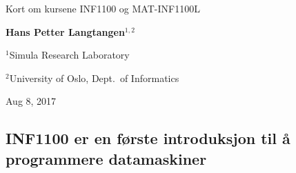 \documentclass[%
oneside,                 %
final,                   %
10pt]{article}
\begin{document}

\newcommand{\exercisesection}[1]{\subsection*{#1}}







\thispagestyle{empty}

\begin{center}
{\LARGE\bf
\begin{spacing}{1.25}
Kort om kursene INF1100 og MAT-INF1100L
\end{spacing}
}
\end{center}


\begin{center}
{\bf Hans Petter Langtangen${}^{1, 2}$} \\ [0mm]
\end{center}

\begin{center}
\centerline{{\small ${}^1$Simula Research Laboratory}}
\centerline{{\small ${}^2$University of Oslo, Dept.~of Informatics}}
\end{center}
    

\begin{center}
Aug 8, 2017
\end{center}

\vspace{1cm}


\subsection*{INF1100 er en første introduksjon til å programmere datamaskiner}


\end{document}
